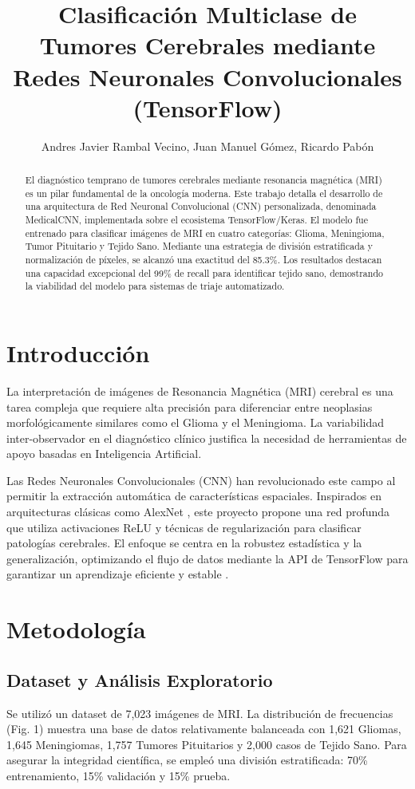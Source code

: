 \documentclass[letterpaper, 10 pt, conference]{ieeeconf}
\title{\LARGE \bf
Clasificación Multiclase de Tumores Cerebrales mediante Redes Neuronales Convolucionales (TensorFlow)
}
\author{
Andres Javier Rambal Vecino,
Juan Manuel Gómez,
Ricardo Pabón
}
\begin{document}
\maketitle
\thispagestyle{empty}
\pagestyle{empty}

\begin{abstract}
El diagnóstico temprano de tumores cerebrales mediante resonancia magnética (MRI) es un pilar fundamental de la oncología moderna. Este trabajo detalla el desarrollo de una arquitectura de Red Neuronal Convolucional (CNN) personalizada, denominada MedicalCNN, implementada sobre el ecosistema TensorFlow/Keras. El modelo fue entrenado para clasificar imágenes de MRI en cuatro categorías: Glioma, Meningioma, Tumor Pituitario y Tejido Sano. Mediante una estrategia de división estratificada y normalización de píxeles, se alcanzó una exactitud del 85.3\%. Los resultados destacan una capacidad excepcional del 99\% de recall para identificar tejido sano, demostrando la viabilidad del modelo para sistemas de triaje automatizado.
\end{abstract}

\section{Introducción}
La interpretación de imágenes de Resonancia Magnética (MRI) cerebral es una tarea compleja que requiere alta precisión para diferenciar entre neoplasias morfológicamente similares como el Glioma y el Meningioma. La variabilidad inter-observador en el diagnóstico clínico justifica la necesidad de herramientas de apoyo basadas en Inteligencia Artificial.

Las Redes Neuronales Convolucionales (CNN) han revolucionado este campo al permitir la extracción automática de características espaciales. Inspirados en arquitecturas clásicas como AlexNet \cite{c1}, este proyecto propone una red profunda que utiliza activaciones ReLU y técnicas de regularización para clasificar patologías cerebrales. El enfoque se centra en la robustez estadística y la generalización, optimizando el flujo de datos mediante la API de TensorFlow para garantizar un aprendizaje eficiente y estable \cite{c6}.

\section{Metodología}

\subsection{Dataset y Análisis Exploratorio}
Se utilizó un dataset de 7,023 imágenes de MRI. La distribución de frecuencias (Fig. 1) muestra una base de datos relativamente balanceada con 1,621 Gliomas, 1,645 Meningiomas, 1,757 Tumores Pituitarios y 2,000 casos de Tejido Sano. Para asegurar la integridad científica, se empleó una división estratificada: 70\% entrenamiento, 15\% validación y 15\% prueba.
\end{document}
